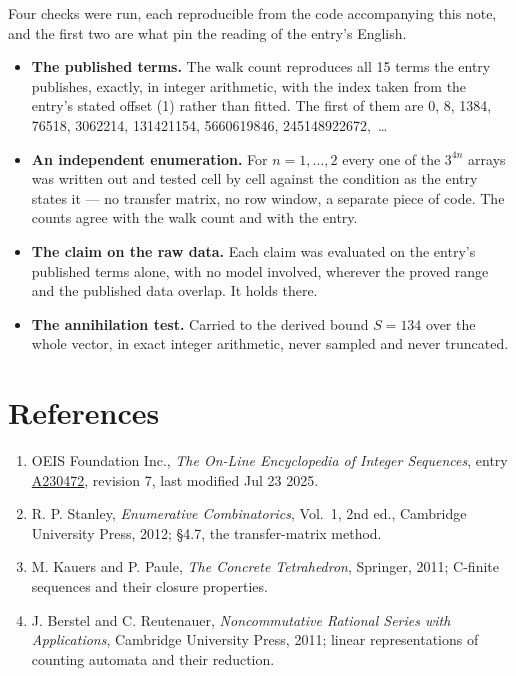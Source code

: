 \documentclass[11pt]{article}
\theoremstyle{definition}
\begin{document}
Four checks were run, each reproducible from the code accompanying this note, and the first two are what pin the reading of the entry's English.

\begin{itemize}

\item {\bfseries The published terms.} The walk count reproduces all 15 terms the entry publishes, exactly, in integer arithmetic, with the index taken from the entry's stated offset (1) rather than fitted. The first of them are 0, 8, 1384, 76518, 3062214, 131421154, 5660619846, 245148922672,~\dots

\item {\bfseries An independent enumeration.} For $n = 1,\dots,2$ every one of the $3^{4n}$ arrays was written out and tested cell by cell against the condition as the entry states it --- no transfer matrix, no row window, a separate piece of code. The counts agree with the walk count and with the entry.

\item {\bfseries The claim on the raw data.} Each claim was evaluated on the entry's published terms alone, with no model involved, wherever the proved range and the published data overlap. It holds there.

\item {\bfseries The annihilation test.} Carried to the derived bound $S = 134$ over the whole vector, in exact integer arithmetic, never sampled and never truncated.

\end{itemize}

\section{References}

\begin{enumerate}

\item OEIS Foundation Inc., \emph{The On-Line Encyclopedia of Integer Sequences}, entry \href{https://oeis.org/A230472}{A230472}, revision 7, last modified Jul 23 2025.

\item R. P. Stanley, \emph{Enumerative Combinatorics}, Vol.~1, 2nd ed., Cambridge University Press, 2012; \S4.7, the transfer-matrix method.

\item M. Kauers and P. Paule, \emph{The Concrete Tetrahedron}, Springer, 2011; C-finite sequences and their closure properties.

\item J. Berstel and C. Reutenauer, \emph{Noncommutative Rational Series with Applications}, Cambridge University Press, 2011; linear representations of counting automata and their reduction.

\end{enumerate}
\end{document}
